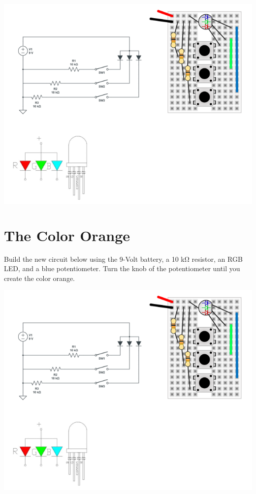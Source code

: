 \documentclass[
]{book}
\begin{document}
\includegraphics{images/rgb_led_diagram.png}

\hypertarget{the-color-orange}{%
\chapter{The Color Orange}\label{the-color-orange}}

Build the new circuit below using the 9-Volt battery, a 10 kΩ resistor, an RGB LED, and a blue potentiometer. Turn the knob of the potentiometer until you create the color orange.

\includegraphics{images/rgb_led_diagram.png}
\end{document}
